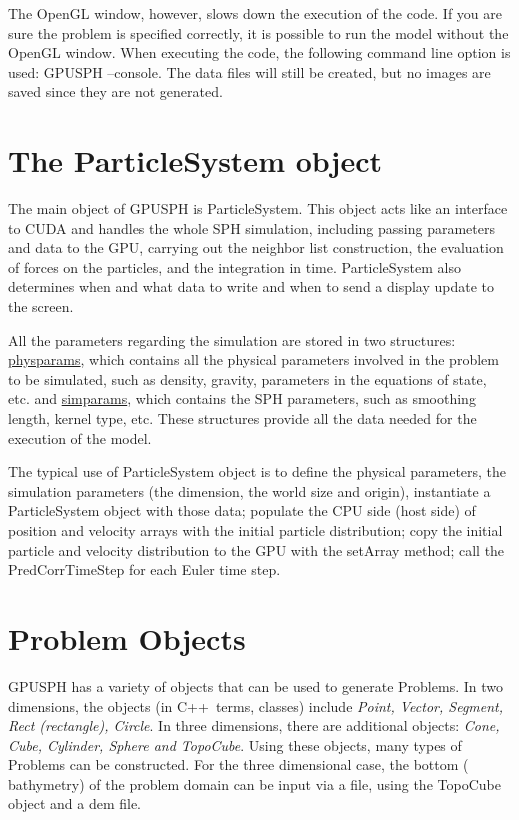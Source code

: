 \documentclass[12pt]{memoir}
\newcommand{\cpp}{{\sffamily C\ttfamily++}}
\begin{document}
The OpenGL window, however, slows down the execution of the code. If
you are sure the problem is specified correctly, it is possible to run
the model without the OpenGL window. When executing the code, the
following command line option is used: GPUSPH --console. The data
files will still be created, but no images are saved since they are not
generated.

\fi

\section{The ParticleSystem object}


The main object of GPUSPH is ParticleSystem. This object acts like an
interface to CUDA and handles the whole SPH simulation, including
passing parameters and data to the GPU, carrying out the neighbor list
construction, the evaluation of forces on the particles, and the
integration in time. ParticleSystem also determines when and what data
to write and when to send a display update to the screen.

All the parameters regarding the simulation are stored in two
structures: \underline{physparams}, which contains all the physical
parameters involved in the problem to be simulated, such as density,
gravity, parameters in the equations of state, etc. and
\underline{simparams}, which contains the SPH parameters, such as
smoothing length, kernel type, etc. These structures provide all the
data needed for the execution of the model.


The typical use of ParticleSystem object is to define the physical
parameters, the simulation parameters (the dimension, the world size and
origin), instantiate a ParticleSystem object with those data; populate
the CPU side (host side) of position and velocity arrays with the
initial particle distribution; copy the initial particle and velocity
distribution to the GPU with the setArray method; call the
PredCorrTimeStep for each Euler time step.


\section{Problem Objects}\label{objects}

GPUSPH has a variety of objects that can be used to generate Problems.
In two dimensions, the objects (in \cpp\ terms, classes) include {\em
Point, Vector, Segment, Rect (rectangle), Circle}. In three
dimensions, there are additional objects: {\em Cone, Cube, Cylinder,
Sphere and TopoCube}. Using these objects, many types of Problems can
be constructed. For the three dimensional case, the bottom (
bathymetry) of the problem domain can be input via a file, using the
TopoCube object and a dem file.
\end{document}
